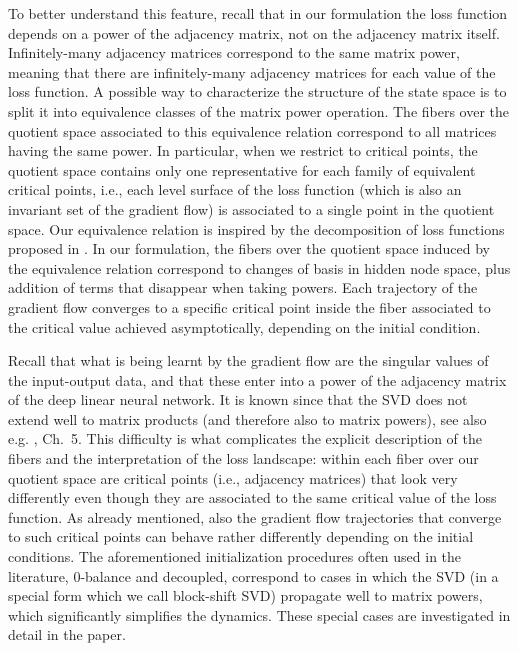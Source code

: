 \documentclass{article}
\newcommand{\1}{\mathds{1}}
\begin{document}
To better understand this feature, recall that in our formulation the loss function depends on a power of the adjacency matrix, not on the adjacency matrix itself.
Infinitely-many adjacency matrices correspond to the same matrix power, meaning that there are infinitely-many adjacency matrices for each value of the loss function. 
A possible way to characterize the structure of the state space is to split it into  equivalence classes of the matrix power operation. 
The fibers over the quotient space associated to this equivalence relation correspond to all matrices having the same power.
In particular, when we restrict to critical points, the quotient space contains only one representative for each family of equivalent critical points, i.e., each level surface of the loss function (which is also an invariant set of the gradient flow) is associated to a single point in the quotient space.
Our equivalence relation is inspired by the decomposition of loss functions proposed in \cite{trager2019pure}.
In our formulation, the fibers over the quotient space induced by the equivalence relation correspond to changes of basis in hidden node space, plus addition of terms that disappear when taking powers.
Each trajectory of the gradient flow converges to a specific critical point inside the fiber associated to the critical value achieved asymptotically, depending on the initial condition.

Recall that what is being learnt by the gradient flow are the singular values of the input-output data, and that these enter into a power of the adjacency matrix of the deep linear neural network.
It is known since \cite{de1992structure} that the SVD does not extend well to matrix products (and therefore also to matrix powers), see also e.g. \cite{zhang2017matrix}, Ch.~5. 
This difficulty is what complicates the explicit description of the fibers and the  interpretation of the loss landscape: within each fiber over our quotient space are critical points (i.e., adjacency matrices) that look very differently even though they are associated to the same critical value of the loss function.
As already mentioned, also the gradient flow trajectories that converge to such critical points can behave rather differently depending on the initial conditions.
The aforementioned initialization procedures often used in the literature, 0-balance and decoupled, correspond to cases in which the SVD (in a special form which we call block-shift SVD) propagate well to matrix powers, which significantly simplifies the dynamics.
These special cases are investigated in detail in the paper. 
\end{document}
